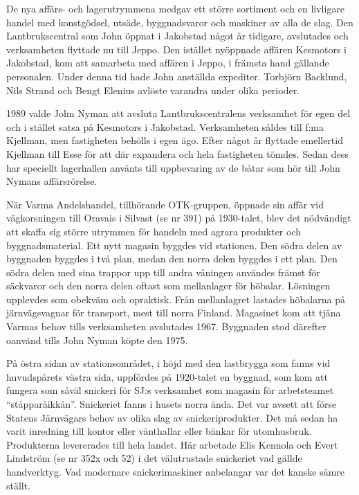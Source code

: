 {De nya affärs- och lagerutrymmena medgav ett större sortiment och en livligare handel med konstgödsel, utsäde, byggnadsvaror och maskiner av alla de slag. Den Lantbrukscentral som John öppnat i Jakobstad något år tidigare, avslutades och verksamheten flyttade nu till Jeppo. Den istället nyöppnade affären Kesmotors i Jakobstad, kom att samarbeta med affären i Jeppo, i främsta hand gällande personalen. Under denna tid hade John anställda expediter. Torbjörn Backlund, Nils Strand och Bengt Elenius avlöste varandra under olika perioder.

1989 valde John Nyman att avsluta Lantbrukscentralens verksamhet för egen del och i stället satsa på Kesmotors i Jakobstad. Verksamheten såldes till f:ma Kjellman, men fastigheten behölls i egen ägo. Efter något år flyttade emellertid Kjellman till Esse för att där expandera  och hela fastigheten tömdes. Sedan dess har speciellt lagerhallen använts till uppbevaring av de båtar som hör till John Nymans affärsrörelse.


När Varma Andelshandel, tillhörande OTK-gruppen, öppnade sin affär vid vägkorsningen till Oravais i Silvast (se nr 391) på 1930-talet, blev det nödvändigt att skaffa sig större utrymmen för handeln med agrara produkter och byggnadsmaterial. Ett nytt magasin byggdes vid stationen. Den södra delen av byggnaden byggdes i två plan, medan den norra delen byggdes i ett plan. Den södra delen med sina trappor upp till andra våningen användes främst för säckvaror och den norra delen oftast som mellanlager för höbalar. Lösningen upplevdes som obekväm och opraktisk. Från mellanlagret lastades höbalarna på järnvägsvagnar för transport, mest till norra Finland. Magasinet kom att tjäna Varmas behov tills verksamheten avslutades 1967. Byggnaden stod därefter oanvänd tills John Nyman köpte den 1975.




\jhnooccupant{}


På östra sidan av stationsområdet, i höjd med den lastbrygga som fanns vid huvudspårets västra sida, uppfördes på 1920-talet en byggnad, som kom att fungera som såväl snickeri för SJ:s verksamhet som magasin för arbetsteamet ``ståpparåikkån''. Snickeriet fanns i husets norra ända. Det var avsett att förse Statens Järnvägars behov av olika slag av snickeriprodukter. Det må sedan ha varit inredning till kontor eller vänthallar eller bänkar för utomhusbruk. Produkterna levererades till hela landet. Här arbetade Elis Kennola och Evert Lindström (se nr 352x och 52) i det välutrustade snickeriet vad gällde handverktyg. Vad modernare snickerimaskiner anbelangar var det kanske sämre ställt.

}
